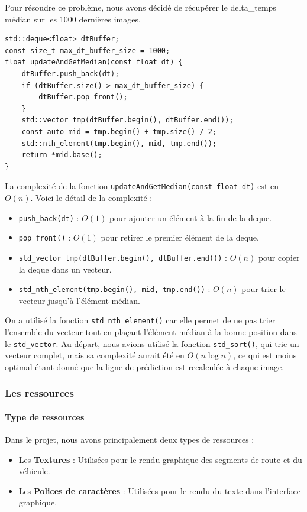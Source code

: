 Pour résoudre ce problème, nous avons décidé de récupérer le \gls{delta_temps} médian sur les 1000 dernières images.

\begin{lstlisting}[style=CStyle, label={lst:code_dequeue_dt}]
std::deque<float> dtBuffer;
const size_t max_dt_buffer_size = 1000;
float updateAndGetMedian(const float dt) {
    dtBuffer.push_back(dt);
    if (dtBuffer.size() > max_dt_buffer_size) {
        dtBuffer.pop_front();
    }
    std::vector tmp(dtBuffer.begin(), dtBuffer.end());
    const auto mid = tmp.begin() + tmp.size() / 2;
    std::nth_element(tmp.begin(), mid, tmp.end());
    return *mid.base();
}
\end{lstlisting}

La complexité de la fonction \texttt{updateAndGetMedian(const float dt)} est en \( O(n) \).
Voici le détail de la complexité :
\begin{itemize}
    \item \texttt{push\_back(dt)} : \( O(1) \)\cite{cpp_reference_push_back} pour ajouter un élément à la fin de la deque.
    \item \texttt{pop\_front()} : \( O(1) \)\cite{cpp_reference_pop_front} pour retirer le premier élément de la deque.
    \item \texttt{\gls{std_vector} tmp(dtBuffer.begin(), dtBuffer.end())} : \( O(n) \)\cite{cpp_reference_vector} pour copier la deque dans un vecteur.
    \item \texttt{\gls{std_nth_element}(tmp.begin(), mid, tmp.end())} : \( O(n) \)\cite{cpp_reference_std_nth_element} pour trier le vecteur jusqu'à l'élément médian.
\end{itemize}

On a utilisé la fonction \texttt{\gls{std_nth_element}()}\cite{cpp_reference_std_nth_element} car elle permet de ne pas trier l'ensemble du vecteur tout en plaçant l'élément médian à la bonne position dans le \texttt{\gls{std_vector}}\cite{cpp_reference_vector}.
Au départ, nous avions utilisé la fonction \texttt{\gls{std_sort}()}, qui trie un vecteur complet, mais sa complexité aurait été en \( O(n \log n) \)\cite{cpp_reference_std_sort}, ce qui est moins optimal étant donné que la ligne de prédiction est recalculée à chaque image.


\subsubsection{Les ressources}\label{subsubsec:gestion-des-ressources}
\paragraph{Type de ressources}
Dans le projet, nous avons principalement deux types de ressources :
\begin{itemize}
    \item Les \textbf{Textures} : Utilisées pour le rendu graphique des segments de route et du véhicule.
    \item Les \textbf{Polices de caractères} : Utilisées pour le rendu du texte dans l'interface graphique.
\end{itemize}

